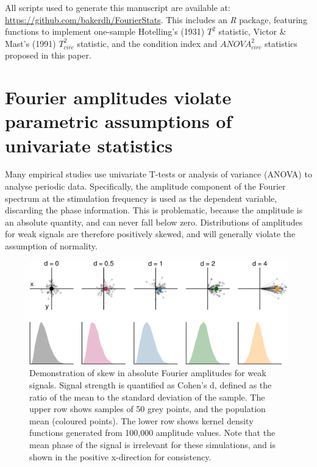 \documentclass[]{article}
\begin{document}
All scripts used to generate this manuscript are available at: \url{https://github.com/bakerdh/FourierStats}. This includes an \emph{R} package, featuring functions to implement one-sample Hotelling's (1931) \(T^2\) statistic, Victor \& Mast's (1991) \(T^2_{circ}\) statistic, and the condition index and \(ANOVA^2_{circ}\) statistics proposed in this paper.

\hypertarget{fourier-amplitudes-violate-parametric-assumptions-of-univariate-statistics}{%
\section{Fourier amplitudes violate parametric assumptions of univariate statistics}\label{fourier-amplitudes-violate-parametric-assumptions-of-univariate-statistics}}

Many empirical studies use univariate T-tests or analysis of variance (ANOVA) to analyse periodic data. Specifically, the amplitude component of the Fourier spectrum at the stimulation frequency is used as the dependent variable, discarding the phase information. This is problematic, because the amplitude is an absolute quantity, and can never fall below zero. Distributions of amplitudes for weak signals are therefore positively skewed, and will generally violate the assumption of normality.

\begin{figure}

{\centering \includegraphics{manuscript_files/figure-latex/amphists-1} 

}

\caption{Demonstration of skew in absolute Fourier amplitudes for weak signals. Signal strength is quantified as Cohen's d, defined as the ratio of the mean to the standard deviation of the sample. The upper row shows samples of 50 grey points, and the population mean (coloured points). The lower row shows kernel density functions generated from 100,000 amplitude values. Note that the mean phase of the signal is irrelevant for these simulations, and is shown in the positive x-direction for consistency.}\label{fig:amphists}
\end{figure}
\end{document}
